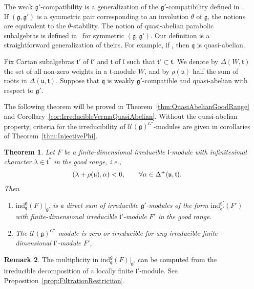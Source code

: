 \documentclass[10pt,a4paper]{amsart}
\numberwithin{equation}{section}
\newtheorem{Theorem}{Theorem}[section]
\theoremstyle{definition}
\newtheorem{Remark}[Theorem]{Remark}
\newcommand{\Hom}{\mathrm{Hom}}
\newcommand{\lieC}[1]{\mathfrak{#1}}
\newcommand{\lie}[1]{\mathfrak{#1}}
\newcommand{\univ}[1]{\mathcal{U}(\lieC{#1})}
\newcommand{\ind}[2]{\mathrm{ind}^{\lieC{#1}}_{\lieC{#2}}}
\let\Re\relax
\DeclareMathOperator{\Re}{\mathrm{Re}}
\newcommand{\rhog}[1]{\rho(#1)}
\begin{document}
The weak $\lie{g'}$-compatibility is a generalization of the $\lie{g'}$-compatibility defined in~\cite{Ko12_generalized_Verma}.
If $(\lie{g}, \lie{g'})$ is a symmetric pair corresponding to an involution $\theta$ of $\lie{g}$, the notions are equivalent to the $\theta$-stability.
The notion of quasi-abelian parabolic subalgebras is defined in~\cite[p.~109]{HMSW87} for symmetric $(\lie{g}, \lie{g'})$.
Our definition is a straightforward generalization of theirs.
For example, if \smash{${\bigl[\lie{u}\cap (\lie{g'})^\perp, \lie{u'}\bigr] = 0}$}, then $\lie{q}$ is quasi-abelian.

Fix Cartan subalgebras $\lie{t'}$ of $\lie{l'}$ and $\lie{t}$ of $\lie{l}$ such that $\lie{t'}\subset \lie{t}$.
We denote by $\Delta(W, \lie{t})$ the set of all non-zero weights in a $\lie{t}$-module $W$,
and by $\rhog{\lie{u}}$ half the sum of roots in $\Delta(\lie{u}, \lie{t})$.
Suppose that $\lie{q}$ is weakly $\lie{g'}$-compatible and quasi-abelian with respect to $\lie{g'}$.

The following theorem will be proved in Theorem~\ref{thm:QuasiAbelianGoodRange} and Corollary~\ref{cor:IrreducibleVermaQuasiAbelian}.
Without the quasi-abelian property, criteria for the irreducibility of $\univ{g}^{G'}$-modules are given in corollaries of Theorem~\ref{thm:InjectivePhi}.

\begin{Theorem}\label{intro:GeneralizedVerma}
	Let $F$ be a finite-dimensional irreducible $\lie{l}$-module with infinitesimal character $\lambda \in \lie{t}^*$ in the good range, i.e.,
	\begin{align*}
		\Re(\lambda + \rhog{\lie{u}}, \alpha) < 0, \qquad \forall \alpha \in \Delta^+(\lie{u}, \lie{t}).
	\end{align*}
	Then
	\begin{enumerate}\itemsep=0pt
		\item[$1.$] $\ind{g}{q}(F)|_{\lie{g'}}$ is a direct sum of irreducible $\lie{g'}$-modules of the form $\ind{g'}{q'}(F')$ with finite-dimensional irreducible $\lie{l'}$-module $F'$ in the good range.
		\item[$2.$] The $\univ{g}^{G'}$-module \smash{$\Hom_{\lie{g'}}\bigl(\ind{g'}{q'}(F'), \ind{g}{q}(F)|_{\lie{g'}}\bigr)$} is zero or irreducible for any irreducible finite-dimensional $\lie{l'}$-module $F'$,
	\end{enumerate}
\end{Theorem}

\begin{Remark}
	The multiplicity in $\ind{g}{q}(F)|_{\lie{g'}}$ can be computed from the irreducible decomposition of a locally finite $\lie{l'}$-module.
	See Proposition~\ref{prop:FiltrationRestriction}.
\end{Remark}
\end{document}
